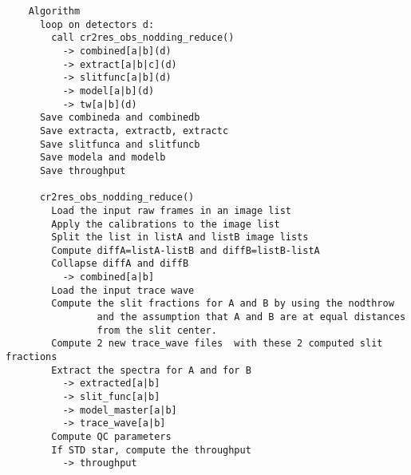 \begin{verbatim}
    Algorithm                                                             
      loop on detectors d:                                                
        call cr2res_obs_nodding_reduce()                                  
          -> combined[a|b](d)                                             
          -> extract[a|b|c](d)                                            
          -> slitfunc[a|b](d)                                             
          -> model[a|b](d)                                                
          -> tw[a|b](d)                                                   
      Save combineda and combinedb                                        
      Save extracta, extractb, extractc                                   
      Save slitfunca and slitfuncb                                        
      Save modela and modelb                                              
      Save throughput                                                     
                                                                          
      cr2res_obs_nodding_reduce()                                         
        Load the input raw frames in an image list                        
        Apply the calibrations to the image list                          
        Split the list in listA and listB image lists                     
        Compute diffA=listA-listB and diffB=listB-listA                   
        Collapse diffA and diffB                                          
          -> combined[a|b]                                                
        Load the input trace wave                                         
        Compute the slit fractions for A and B by using the nodthrow      
                and the assumption that A and B are at equal distances    
                from the slit center.                                     
        Compute 2 new trace_wave files  with these 2 computed slit fractions
        Extract the spectra for A and for B                               
          -> extracted[a|b]                                               
          -> slit_func[a|b]                                               
          -> model_master[a|b]                                            
          -> trace_wave[a|b]                                              
        Compute QC parameters                                             
        If STD star, compute the throughput                               
          -> throughput                                                   
                                                                          

\end{verbatim}
